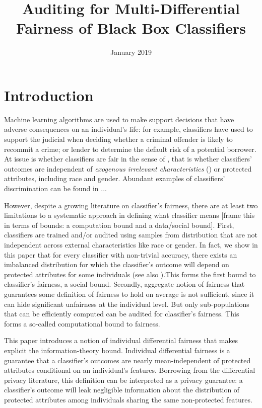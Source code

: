 \documentclass{article}
\title{Auditing for Multi-Differential Fairness of Black Box Classifiers}
\author{}
\date{January 2019}
\begin{document}
\maketitle

\section{Introduction}
Machine learning algorithms are used to make support decisions that have adverse consequences on an individual's life: for example, classifiers have used to support the judicial when deciding whether a criminal offender is likely to recommit a crime; or lender to determine the default risk of a potential borrower. At issue is whether classifiers are fair in the sense of \cite{calsamiglia2009decentralizing} , that is whether classifiers' outcomes are independent of \textit{exogenous irrelevant characteristics} (\cite{calsamiglia2009decentralizing}) or protected attributes, including race and gender. Abundant examples of classifiers' discrimination can be found in ... 

\bigskip
However, despite a growing literature on classifier's fairness, there are at least two limitations to a systematic approach in defining what classifier means [frame this in terms of bounds: a computation bound and a data/social bound]. First, classifiers are trained and/or audited using samples from distribution that are not independent across external characteristics like race or gender. In fact, we show in this paper that for every classifier with non-trivial accuracy, there exists an imbalanced distribution for which the classifier's outcome will depend on protected attributes for some individuals (see also \cite{kleinberg2016inherent}).This forms the first bound to classifier's fairness, a social bound. Secondly, aggregate notion of fairness that guarantees some definition of fairness to hold on average is not sufficient, since it can hide significant unfairness at the individual level. But only sub-populations that can be efficiently computed can be audited for classifier's fairness. This forms a so-called computational bound to fairness.

\bigskip
This paper introduces a notion of individual differential fairness that makes explicit the information-theory bound. Individual differential fairness is a guarantee that a classifier's outcomes are nearly mean-independent of protected attributes conditional on an individual's features. Borrowing from the differential privacy literature, this definition can be interpreted as a privacy guarantee: a classifier's outcome will leak negligible information about the distribution of protected attributes among individuals sharing the same non-protected features. 
\end{document}
